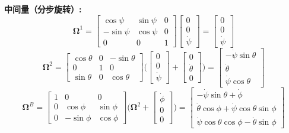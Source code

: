 \documentclass[../main.tex]{subfiles}
\begin{document}
\begin{enumerate}
{{\bigskip
\noindent\textbf{中间量（分步旋转）:}
\[
\boldsymbol{\Omega}^1
=
\begin{bmatrix}
\cos\psi & \sin\psi & 0\\[4pt]
-\sin\psi & \cos\psi & 0\\[4pt]
0 & 0 & 1
\end{bmatrix}
\begin{bmatrix}0\\[4pt]0\\[4pt]\dot{\psi}\end{bmatrix}
=
\begin{bmatrix}0\\[4pt]0\\[4pt]\dot{\psi}\end{bmatrix}
\]
\[
\boldsymbol{\Omega}^2
=
\begin{bmatrix}
\cos\theta & 0 & -\sin\theta\\[4pt]
0 & 1 & 0\\[4pt]
\sin\theta & 0 & \cos\theta
\end{bmatrix}
\Bigg(\begin{bmatrix}0\\[4pt]0\\[4pt]\dot{\psi}\end{bmatrix}
+
\begin{bmatrix}0\\[4pt]\dot{\theta}\\[4pt]0\end{bmatrix}\Bigg)
=
\begin{bmatrix}-\dot{\psi}\sin\theta\\[4pt]\dot{\theta}\\[4pt]\dot{\psi}\cos\theta\end{bmatrix}
\]
\[
\boldsymbol{\Omega}^B
=
\begin{bmatrix}
1 & 0 & 0\\[4pt]
0 & \cos\phi & \sin\phi\\[4pt]
0 & -\sin\phi & \cos\phi
\end{bmatrix}
\Bigg(\boldsymbol{\Omega}^2
+
\begin{bmatrix}\dot{\phi}\\[4pt]0\\[4pt]0\end{bmatrix}\Bigg)
=
\begin{bmatrix}
-\dot{\psi}\sin\theta + \dot{\phi}\\[6pt]
\dot{\theta}\cos\phi + \dot{\psi}\cos\theta\sin\phi\\[6pt]
\dot{\psi}\cos\theta\cos\phi - \dot{\theta}\sin\phi
\end{bmatrix}
\]

}}
\end{enumerate}
\end{document}

